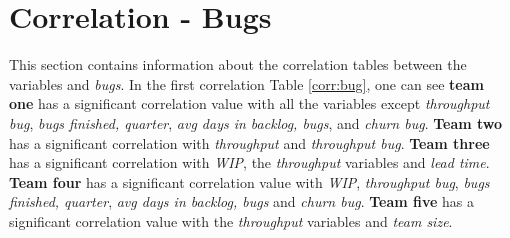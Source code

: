 \documentclass[UKenglish]{ifimaster}  %
\begin{document}
\section{Correlation - Bugs}
\label{sec:corr:bug}
This section contains information about the correlation tables between the variables and \textit{bugs}. In the first correlation 
Table \ref{corr:bug}, one can see \textbf{team one} has a significant correlation value with all the variables except \textit{throughput bug}, \textit{bugs finished, quarter}, \textit{avg days in backlog, bugs}, and \textit{churn bug}. \textbf{Team two} has a significant correlation with \textit{throughput} and \textit{throughput bug}. \textbf{Team three} has a significant correlation with \textit{WIP}, the \textit{throughput} variables and \textit{lead time}. \textbf{Team four} has a significant correlation value with \textit{WIP}, \textit{throughput bug}, \textit{bugs finished, quarter}, \textit{avg days in backlog, bugs} and \textit{churn bug}. \textbf{Team five} has a significant correlation value with the \textit{throughput} variables and \textit{team size}. 
\end{document}
